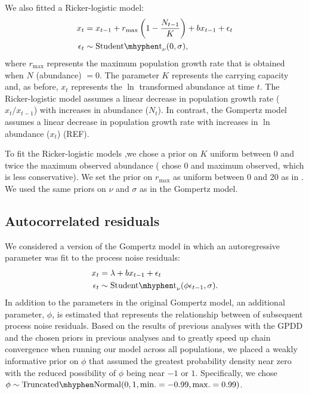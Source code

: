 \documentclass[11pt]{article}
\begin{document}
We also fitted a Ricker-logistic model:
\begin{align*}
x_t &= x_{t-1} + r_{\mathrm{max}}\left(1 - \frac{N_{t-1}}{K}\right) + b x_{t-1} + \epsilon_t\\
\epsilon_t &\sim \mathrm{Student\mhyphen t}_\nu(0, \sigma),
\end{align*}
\noindent
where  $r_\mathrm{max}$ represents the maximum population growth rate that is obtained when $N$ (abundance) $= 0$. The parameter $K$ represents the carrying capacity and, as before, $x_t$ represents the $\ln$ transformed abundance at time $t$. The Ricker-logistic model assumes a linear decrease in population growth rate ($x_t / x_{t-1}$) with increases in abundance ($N_t$). In contrast, the Gompertz model assumes a linear decrease in population growth rate with increases in $\ln$ abundance ($x_t$) (REF).

To fit the Ricker-logistic models ,we chose a prior on $K$ uniform between 0 and twice the maximum observed abundance (\citet{clark2010} chose 0 and maximum observed, which is less conservative). We set the prior on $r_\mathrm{max}$ as uniform between 0 and 20 as in \citet{clark2010}. We used the same priors on $\nu$ and $\sigma$ as in the Gompertz model.

\subsection{Autocorrelated residuals}

We considered a version of the Gompertz model in which an autoregressive parameter was fit to the process noise residuals:
\begin{align*}
x_t &= \lambda + b x_{t-1} + \epsilon_t\\
\epsilon_t &\sim \mathrm{Student\mhyphen t}_\nu(\phi \epsilon_{t-1}, \sigma).
\end{align*}
\noindent
In addition to the parameters in the original Gompertz model, an additional parameter, $\phi$, is estimated that represents the relationship between of subsequent process noise residuals. Based on the results of previous analyses with the GPDD \citep[e.g.][]{connors2014} and the chosen priors in previous analyses \citep[e.g.][]{thorson2014a} and to greatly speed up chain convergence when running our model across all populations, we placed a weakly informative prior on $\phi$ that assumed the greatest probability density near zero with the reduced possibility of $\phi$ being near $-1$ or $1$. Specifically, we chose $\phi \sim \mathrm{Truncated\mhyphen Normal}(0, 1, \mathrm{min.} = -0.99, \mathrm{max.} = 0.99)$.
\end{document}
